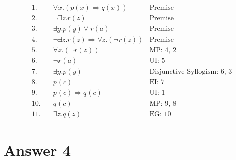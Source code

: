 \documentclass[12pt]{article}
\begin{document}
\begin{align*}
    1. \hspace{1em} & \forall x.\left(p(x) \Rightarrow q(x)\right)                                  & \text{Premise} \\
    2. \hspace{1em} & \neg\exists z.r(z)                                                            & \text{Premise} \\
    3. \hspace{1em} & \exists y.p(y) \lor r(a)                                                      & \text{Premise} \\
    4. \hspace{1em} & \neg\exists z.r(z) \Rightarrow \forall z.\left(\neg r(z)\right)               & \text{Premise} \\
    5. \hspace{1em} & \forall z.\left(\neg r(z)\right)                                              & \text{MP: 4, 2} \\
    6. \hspace{1em} & \neg r(a)                                                                     & \text{UI: 5} \\
    7. \hspace{1em} & \exists y.p(y)                                                                & \text{Disjunctive Syllogism: 6, 3} \\
    8. \hspace{1em} & p(c)                                                                          & \text{EI: 7} \\
    9. \hspace{1em} & p(c) \Rightarrow q(c)                                                         & \text{UI: 1} \\
    10. \hspace{1em} & q(c)                                                                         & \text{MP: 9, 8} \\
    11. \hspace{1em} & \exists z.q(z)                                                               & \text{EG: 10}
\end{align*}

\newpage

\section*{Answer 4}
\end{document}
